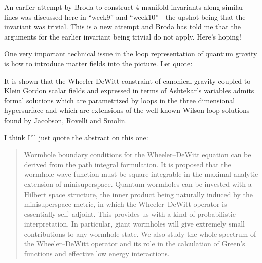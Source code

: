 \documentclass{article}
\def\tightlist{}
\renewcommand{\texttt}[1]{%
  \begingroup
  \ttfamily
  \begingroup\lccode`~=`/\lowercase{\endgroup\def~}{/\discretionary{}{}{}}%
  \begingroup\lccode`~=`[\lowercase{\endgroup\def~}{[\discretionary{}{}{}}%
  \begingroup\lccode`~=`.\lowercase{\endgroup\def~}{.\discretionary{}{}{}}%
  \catcode`/=\active\catcode`[=\active\catcode`.=\active
  \scantokens{#1\noexpand}%
  \endgroup
}
\begin{document}

An earlier attempt by Broda to construct 4-manifold invariants along
similar lines was discussed here in ``week9'' and ``week10'' - the
upshot being that the invariant was trivial. This is a new attempt and
Broda has told me that the arguments for the earlier invariant being
trivial do not apply. Here's hoping!


One very important technical issue in the loop representation of quantum
gravity is how to introduce matter fields into the picture. Let quote:

It is shown that the Wheeler DeWitt constraint of canonical gravity
coupled to Klein Gordon scalar fields and expressed in terms of
Ashtekar's variables admits formal solutions which are parametrized by
loops in the three dimensional hypersurface and which are extensions of
the well known Wilson loop solutions found by Jacobson, Rovelli and
Smolin.


I think I'll just quote the abstract on this one:

\begin{quote}
Wormhole boundary conditions for the Wheeler--DeWitt equation can be
derived from the path integral formulation. It is proposed that the
wormhole wave function must be square integrable in the maximal analytic
extension of minisuperspace. Quantum wormholes can be invested with a
Hilbert space structure, the inner product being naturally induced by
the minisuperspace metric, in which the Wheeler--DeWitt operator is
essentially self--adjoint. This provides us with a kind of probabilistic
interpretation. In particular, giant wormholes will give extremely small
contributions to any wormhole state. We also study the whole spectrum of
the Wheeler--DeWitt operator and its role in the calculation of Green's
functions and effective low energy interactions.
\end{quote}
\end{document}
